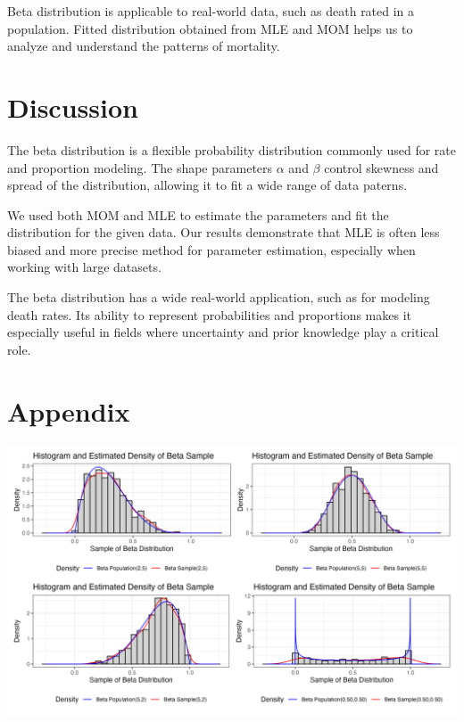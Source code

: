 \documentclass{article}\usepackage[]{graphicx}\usepackage[]{xcolor}
\newenvironment{Figure}
  {\par\medskip\noindent\minipage{\linewidth}}
  {\endminipage\par\medskip}
\begin{document}
\begin{multicols}{2}
Beta distribution is applicable to real-world data, such as death rated in a population. Fitted distribution obtained from MLE and MOM helps us to analyze and understand the patterns of mortality.


\section{Discussion}
The beta distribution is a flexible probability distribution commonly used for rate and proportion modeling. The shape parameters $\alpha$ and $\beta$ control skewness and spread of the distribution, allowing it to fit a wide range of data paterns.

We used both MOM and MLE to estimate the parameters and fit the distribution for the given data. Our results demonstrate that MLE is often less biased and more precise method for parameter estimation, especially when working with large datasets. 

The beta distribution has a wide real-world application, such as for modeling death rates. Its ability to represent probabilities and proportions makes it especially useful in fields where uncertainty and prior knowledge play a critical role.

\vspace{2em}

\begin{tiny}

\end{tiny}
\end{multicols}

\newpage
\onecolumn
\section{Appendix}

\begin{Figure}
 \centering
 \includegraphics[width=\linewidth]{betahists.png}
 \label{fig:sampandpop}
\end{Figure}
\end{document}
